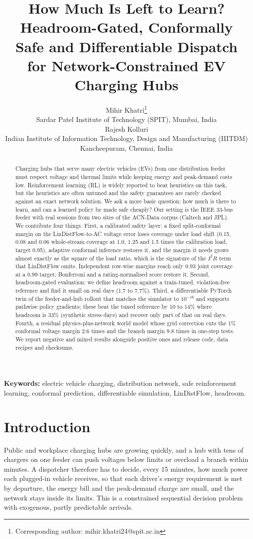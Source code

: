 \documentclass[11pt]{article}
\title{How Much Is Left to Learn? Headroom-Gated, Conformally Safe and Differentiable Dispatch for Network-Constrained EV Charging Hubs}
\author{Mihir Khatri\thanks{Corresponding author: mihir.khatri24@spit.ac.in}\\ \small Sardar Patel Institute of Technology (SPIT), Mumbai, India\\[4pt]
Rajesh Kolluri\\ \small Indian Institute of Information Technology, Design and Manufacturing (IIITDM) Kancheepuram, Chennai, India}
\date{}
\begin{document}
\maketitle

\begin{abstract}
Charging hubs that serve many electric vehicles (EVs) from one distribution feeder must respect voltage and thermal limits while keeping energy and peak-demand costs low. Reinforcement learning (RL) is widely reported to beat heuristics on this task, but the heuristics are often untuned and the safety guarantees are rarely checked against an exact network solution. We ask a more basic question: how much is there to learn, and can a learned policy be made safe cheaply? Our setting is the IEEE 33-bus feeder with real sessions from two sites of the ACN-Data corpus (Caltech and JPL). We contribute four things. First, a calibrated safety layer: a fixed split-conformal margin on the LinDistFlow-to-AC voltage error loses coverage under load shift (0.15, 0.08 and 0.06 whole-stream coverage at 1.0, 1.25 and 1.5 times the calibration load, target 0.95), adaptive conformal inference restores it, and the margin it needs grows almost exactly as the square of the load ratio, which is the signature of the $I^2R$ term that LinDistFlow omits. Independent row-wise margins reach only 0.93 joint coverage at a 0.99 target; Bonferroni and a rating-normalised score restore it. Second, headroom-gated evaluation: we define headroom against a train-tuned, violation-free reference and find it small on real days (1.7 to 7.7\%). Third, a differentiable PyTorch twin of the feeder-and-hub rollout that matches the simulator to $10^{-16}$ and supports pathwise policy gradients; these beat the tuned reference by 10 to 14\% where headroom is 33\% (synthetic stress days) and recover only part of that on real days. Fourth, a residual physics-plus-network world model whose grid correction cuts the 1\% conformal voltage margin 2.6 times and the branch margin 9.8 times in one-step tests. We report negative and mixed results alongside positive ones and release code, data recipes and checksums.
\end{abstract}
\textbf{Keywords:} electric vehicle charging, distribution network, safe reinforcement learning, conformal prediction, differentiable simulation, LinDistFlow, headroom.

\section{Introduction}
Public and workplace charging hubs are growing quickly, and a hub with tens of chargers on one feeder can push voltages below limits or overload a branch within minutes. A dispatcher therefore has to decide, every 15 minutes, how much power each plugged-in vehicle receives, so that each driver's energy requirement is met by departure, the energy bill and the peak-demand charge are small, and the network stays inside its limits. This is a constrained sequential decision problem with exogenous, partly predictable arrivals.
\end{document}
